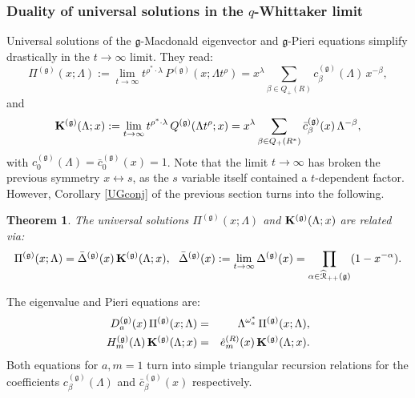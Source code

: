 \documentclass[12pt]{amsart}
\newtheorem{thm}{Theorem}[section]
\newcommand{\g}{{\mathfrak{g}}}
\newcommand{\lL}{{\Lambda}}
\numberwithin{equation}{section}
\begin{document}
\subsubsection{Duality of universal solutions in the $q$-Whittaker limit}

Universal solutions of the $\g$-Macdonald eigenvector and $\g$-Pieri equations simplify drastically in the $t\to\infty$ limit.
They read:
\begin{equation}\label{draone} \Pi^{(\g)}(x;\lL):=\lim_{t\to\infty} t^{\rho^*\cdot\lambda} \,P^{(\g)}(x;\lL t^\rho)=x^\lambda \sum_{\beta\in Q_+(R)} c_\beta^{(\g)}(\lL) \,x^{-\beta}, 
\end{equation}
and
%
%
%
%
%
%
\begin{equation}\label{dratwo}{\bf K}^{(\g)}(\lL;x):=\lim_{t\to\infty} t^{\rho^*\cdot\lambda} \, Q^{(\g)}(\lL t^\rho;x)=
x^\lambda \sum_{\beta\in Q_+(R^*)}
{\bar c}_\beta^{(\g)}(x)\, \lL^{-\beta},
\end{equation}
with $c_0^{(\g)}(\lL)={\bar c}_0^{(\g)}(x)=1$.
%
%
%
%
Note that the limit $t\to\infty$ has broken the previous symmetry $x\leftrightarrow s$,
as the $s$ variable itself contained a $t$-dependent factor. However, Corollary \ref{UGconj} of the previous section turns into the following.


\begin{thm}\label{classmodwhit}
The universal solutions $\Pi^{(\g)}(x;\lL)$ and ${\bf K}^{(\g)}(\lL;x)$ are related via:
\begin{equation}\label{pikappa}
\Pi^{(\g)}(x;\lL)=\bar\Delta^{(\g)}(x)\, {\bf K}^{(\g)}(\lL;x),\ \
\bar\Delta^{(\g)}(x):=\lim_{t\to\infty} \Delta^{(\g)}(x) =\prod_{\alpha \in \widehat{\mathcal R}_{++}(\g)} 
(1-x^{-\alpha}).
\end{equation}
\end{thm}

%
%
%
%
%


The eigenvalue and Pieri equations are:
\begin{eqnarray}
D_a^{(\g)}(x)\, \Pi^{(\g)}(x;\lL)&=&\lL^{\omega_a^*}\, \Pi^{(\g)}(x;\lL), \label{eigenwhitU}\\
%
%
%
H_m^{(\g)}(\lL)\, {\bf K}^{(\g)}(\lL;x)&=&{\hat e}_m^{(R)}(x)\, {\bf K}^{(\g)}(\lL;x). \label{pieriwhitU}
\end{eqnarray}
Both equations for $a,m=1$ turn into simple triangular recursion relations for the 
coefficients $c_\beta^{(\g)}(\lL)$ and ${\bar c}_\beta^{(\g)}(x)$ respectively. 

%
%
%
%
%
%
%
%
%
%
%
%
%
%
%
%
%
%
%
%
%
%
%
%
%
%
%
%
%
%
%
%
\end{document}
